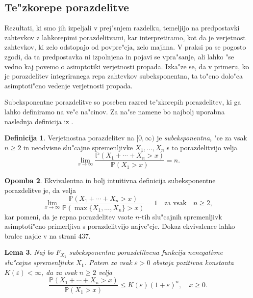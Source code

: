 \documentclass[12pt, a4paper, reqno]{amsart}
\theoremstyle{definition}
\newtheorem{definicija}{Definicija}[section]
\newtheorem{opomba}[definicija]{Opomba}
\theoremstyle{plain}
\newtheorem{lema}[definicija]{Lema}
\newcommand{\Prob}{\mathbb{P}}
\newcommand{\1}{\mathds{1}}
\begin{document}
        
    \subsection{Te"zkorepe porazdelitve}
        Rezultati, ki smo jih izpeljali v prej"snjem razdelku, temeljijo na predpostavki zahtevkov
        z lahkorepimi porazdelitvami, kar interpretiramo, kot da je verjetnost zahtevkov, ki zelo 
        odstopajo od povpre"cja, zelo majhna. V praksi pa se pogosto zgodi, da ta predpostavka ni 
        izpolnjena in pojavi se vpra"sanje, ali lahko "se vedno kaj povemo o asimptotiki verjetnosti 
        propada. Izka"ze se, da v primeru, ko je porazdelitev 
        integriranega repa zahtevkov subeksponentna, ta to"cno dolo"ca asimptoti"cno vedenje verjetnosti 
        propada. 

        Subeksponentne porazdelitve so poseben razred te"zkorepih porazdelitev, ki ga lahko definiramo na 
        ve"c na"cinov. Za na"se namene bo najbolj uporabna naslednja definicija iz \cite{9}.
        \begin{definicija}
            Verjetnostna porazdelitev na $[0, \infty)$ je \textit{subeksponentna}, "ce za vsak $n\geq2$ in 
            neodvisne slu"cajne spremenljivke $X_1, \dots, X_n$ s to porazdelitvijo velja 
            \begin{equation*}
                \lim_{x\to\infty}\frac{\Prob\left(X_1 + \cdots + X_n > x\right)}{\Prob\left(X_1 > x\right)} = n.
            \end{equation*}
            \label{def:subeksponentnaPorazdelitev}
        \end{definicija}

        \begin{opomba}
            Ekvivalentna in bolj intuitivna definicija subeksponentne porazdelitve je, da velja 
            \begin{equation*}
                \lim_{x\to\infty}\frac{\Prob\left(X_1 + \cdots + X_n > x\right)}{\Prob\left(\max\{X_1, \dots, X_n\} > x\right)} = 1 \quad \text{za vsak} \quad n\geq2, 
            \end{equation*}
            kar pomeni, da je repna porazdelitev vsote $n$-tih slu"cajnih spremenljivk asimptoti"cno
            primerljiva s porazdelitvijo najve"cje. Dokaz ekvivalence lahko bralec najde v \cite{9} na strani $437$.
        \end{opomba}

        \begin{lema}
            Naj bo $F_{X_1}$ subeksponentna porazdelitvena funkcija nenegativne slu"cajne spremenljivke 
            $X_1$. Potem za vsak $\varepsilon > 0$ obstaja pozitivna konstanta $K(\varepsilon) < \infty$, 
            da za vsak $n\geq2$ velja 
            \begin{equation*}
                \frac{\Prob(X_1 + \cdots + X_n > x)}{\Prob(X_1 > x)} \leq K(\varepsilon)(1+\varepsilon)^n, \quad x \geq 0. 
            \end{equation*} 
            \label{lema:ocenaSubeksponentnePorazdelitve}
        \end{lema}
\end{document}
